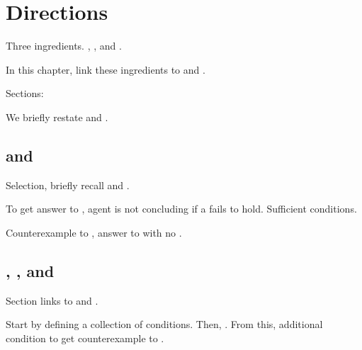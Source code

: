 \chapter{Directions}
\label{cha:binding}

\begin{note}
  Three ingredients.
  , \tC{}, and .

  In this chapter, link these ingredients to \qWhyV{} and \issueConstraint{}.
\end{note}

\begin{note}
  Sections:
  \begin{TOCEnum}
  \item

    We briefly restate \qWhyV{} and \issueConstraint{}.
  \item
  \item
  \end{TOCEnum}
\end{note}

\section{\qWhyV{} and \issueConstraint{}}
\label{sec:recollection}

\begin{note}
  Selection, briefly recall \qWhyV{} and \issueConstraint{}.
\end{note}


\begin{note}


  To get answer to \qWhyV{}, agent is not concluding if a \ros{} fails to hold.
  Sufficient conditions.
\end{note}

\begin{note}

  Counterexample to \issueConstraint{}, answer to \qWhyV{} with no \wit{}.
\end{note}


\section{, \qWhyV{}, and \issueConstraint{}}
\label{sec:comining-ingredients}

\begin{note}
  Section links  to \qWhyV{} and \issueConstraint{}.

  Start by defining a collection of conditions.
  Then, \qWhy{}.
  From this, additional condition to get counterexample to \issueConstraint{}.
\end{note}

